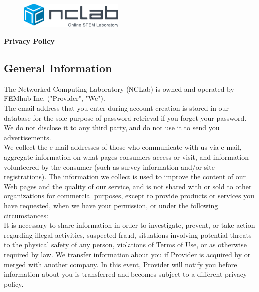 \documentclass{article}
\begin{document}
\large

\vbox{}
\begin{figure}[!ht]
\includegraphics[width=5cm]{logo.png}
\vspace{4mm}
\end{figure}

\centerline{\huge \bf Privacy Policy}
\vspace{6mm}
\noindent
\subsection*{General Information}

The Networked Computing Laboratory (NCLab) is owned and operated by FEMhub Inc. ("Provider", "We").\\

\noindent
The email address that you enter during account creation is stored in our database for the sole purpose of password retrieval if you forget your password. We do not disclose it to any third party, and do not use it to send you advertisements. \\

\noindent
We collect the e-mail addresses of those who communicate with us via e-mail, aggregate information on what pages consumers access or visit, and information volunteered by the consumer (such as survey information and/or site registrations). The information we collect is used to improve the content of our Web pages and the quality of our service, and is not shared with or sold to other organizations for commercial purposes, except to provide products or services you have requested, when we have your permission, or under the following circumstances:\\

\noindent
It is necessary to share information in order to investigate, prevent, or take action regarding illegal activities, suspected fraud, situations involving potential threats to the physical safety of any person, violations of Terms of Use, or as otherwise required by law.
We transfer information about you if Provider is acquired by or merged with another company. In this event, Provider will notify you before information about you is transferred and becomes subject to a different privacy policy.\\
\end{document}

